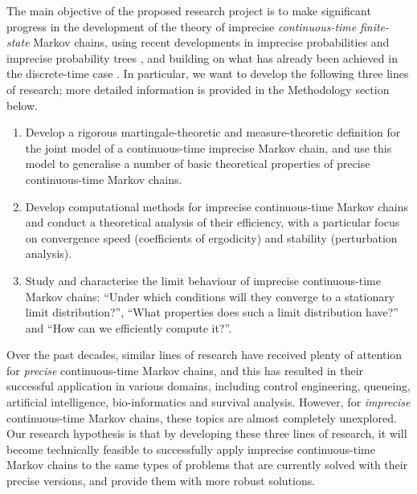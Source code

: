 \documentclass[11pt,dvipsnames,usenames,a4paper]{article}
\begin{document}
The main objective of the proposed research project is to make significant progress in the development of the theory of imprecise \emph{continuous-time} \emph{finite-state} Markov chains, using recent developments in imprecise probabilities \cite{augustin2013:itip,troffaes2013:lp} and imprecise probability trees \cite{shafer2001,cooman2007d}, and building on what has already been achieved in the discrete-time case \cite{cooman2008,hermans2012,skulj2013,cooman2015:markovergodic}. In particular, we want to develop the following three lines of research; more detailed information is provided in the Methodology section below.
\begin{enumerate}[label=\tiny$\blacksquare$,leftmargin=*,noitemsep]
\item Develop a rigorous martingale-theoretic and measure-theoretic definition for the joint model of a continuous-time imprecise Markov chain, and use this model to generalise a number of basic theoretical properties of precise continuous-time Markov chains.
\item Develop computational methods for imprecise continuous-time Markov chains and conduct a theoretical analysis of their efficiency, with a particular focus on convergence speed (coefficients of ergodicity) and stability (perturbation analysis).
\item Study and characterise the limit behaviour of imprecise continuous-time Markov chains: ``Under which conditions will they converge to a stationary limit distribution?'', ``What properties does such a limit distribution have?'' and ``How can we efficiently compute it?''.
\end{enumerate}
Over the past decades, similar lines of research have received plenty of attention for \emph{precise} continuous-time Markov chains, and this has resulted in their successful application in various domains, including control engineering, queueing, artificial intelligence, bio-informatics and survival analysis.
However, for \emph{imprecise} continuous-time Markov chains, these topics are almost completely unexplored.
Our research hypothesis is that by developing these three lines of research, it will become technically feasible to successfully apply imprecise continuous-time Markov chains to the same types of problems that are currently solved with their precise versions, and provide them with more robust solutions.
\end{document}
